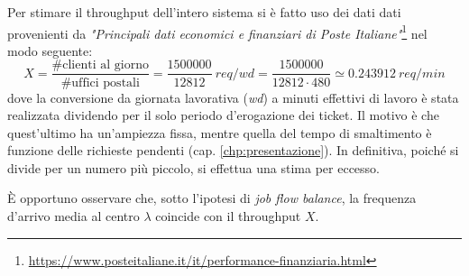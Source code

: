 Per stimare il throughput dell'intero sistema si è fatto uso dei dati dati provenienti da \textsl{"Principali dati economici e finanziari di Poste Italiane"}\footnote{\url{https://www.posteitaliane.it/it/performance-finanziaria.html}} nel modo seguente:
\begin{equation}
X = \frac{\# \text{clienti al giorno}}{\#\text{uffici postali}} = \frac{1500000}{12812}\ req/wd = \frac{1500000}{12812\cdot 480} \simeq 0.243912\ req/min
\end{equation} 
dove la conversione da giornata lavorativa (\textsl{wd}) a minuti effettivi di lavoro è stata realizzata dividendo per il solo periodo d'erogazione dei ticket. Il motivo è che quest'ultimo ha un'ampiezza fissa, mentre quella del tempo di smaltimento è funzione delle richieste pendenti (cap. \ref{chp:presentazione}). In definitiva, poiché si divide per un numero più piccolo, si effettua una stima per eccesso.

È opportuno osservare che, sotto l'ipotesi di \textsl{job flow balance}, la frequenza d'arrivo media al centro $\lambda$ coincide con il throughput $X$.

